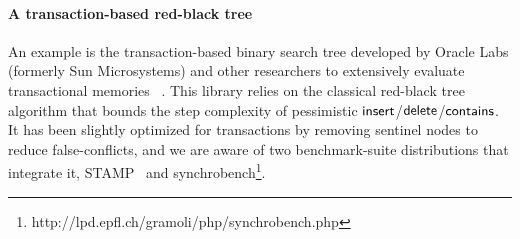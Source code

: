 \paragraph{A transaction-based red-black tree}
An example is the transaction-based binary search tree developed by Oracle Labs (formerly Sun Microsystems) and other researchers 
to extensively evaluate transactional memories~\cite{DSS06,HLMS03,CCKO08,HK08,FFR08,YNW+08,DFGG11} .
This library relies on the classical red-black tree algorithm that bounds the step complexity of pessimistic $\act{insert}$/$\act{delete}$/$\act{contains}$.
It has been slightly optimized for transactions by removing sentinel nodes to reduce false-conflicts, and we are aware of 
two benchmark-suite distributions that integrate it, STAMP~\cite{CCKO08} and synchrobench\footnote{http://lpd.epfl.ch/gramoli/php/synchrobench.php}.



